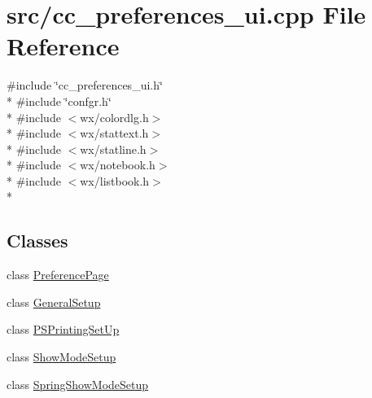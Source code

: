 \hypertarget{a00187}{\section{src/cc\-\_\-preferences\-\_\-ui.cpp File Reference}
\label{a00187}
}
{\ttfamily \#include \char`\"{}cc\-\_\-preferences\-\_\-ui.\-h\char`\"{}}\\*
{\ttfamily \#include \char`\"{}confgr.\-h\char`\"{}}\\*
{\ttfamily \#include $<$wx/colordlg.\-h$>$}\\*
{\ttfamily \#include $<$wx/stattext.\-h$>$}\\*
{\ttfamily \#include $<$wx/statline.\-h$>$}\\*
{\ttfamily \#include $<$wx/notebook.\-h$>$}\\*
{\ttfamily \#include $<$wx/listbook.\-h$>$}\\*
\subsection*{Classes}
\begin{DoxyCompactItemize}
\item 
class \hyperlink{a00116}{Preference\-Page}
\item 
class \hyperlink{a00105}{General\-Setup}
\item 
class \hyperlink{a00121}{P\-S\-Printing\-Set\-Up}
\item 
class \hyperlink{a00141}{Show\-Mode\-Setup}
\item 
class \hyperlink{a00144}{Spring\-Show\-Mode\-Setup}
\end{DoxyCompactItemize}
